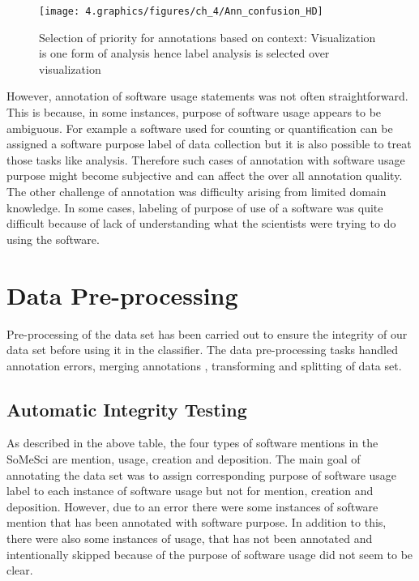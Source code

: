 \begin{figure}[htbp]
	\centering
	\texttt{[image: 4.graphics/figures/ch\_4/Ann\_confusion\_HD]}
	\caption{Selection of priority for annotations based on context: Visualization is one form of analysis hence label analysis is selected over visualization }
	\label{fig:chapter04:setup}
\end{figure}

However, annotation of software usage statements was not often straightforward. This is because, in some instances, purpose of software usage appears to be ambiguous. For example a software used for counting or quantification can be assigned a software purpose label of  data collection but it is also possible to treat those tasks like analysis. Therefore such cases of annotation with software usage purpose might become subjective and can affect the over all annotation quality.\\

The other challenge of annotation was difficulty arising from limited domain knowledge. In some cases, labeling of purpose of use of a software was quite difficult because of lack of understanding what the scientists were trying to do using the software.

\section{Data Pre-processing}
\label{sec:dataset:preprocessing}
Pre-processing of the data set has been carried out to ensure the integrity of our data set before using it in the classifier. The data pre-processing tasks handled annotation errors, merging annotations , transforming and splitting of data set. 

\subsection{Automatic Integrity Testing }
\label{subsec:dataset:preprocessing:handlingerrors}

As described in the above table, the four types of software mentions in the SoMeSci are mention, usage, creation and deposition. The main goal of annotating the data set was to assign corresponding purpose of software usage label to each instance of software usage but not for mention, creation and deposition. However, due to an error there were some instances of software mention that has been annotated with software purpose. In addition to this, there were also some instances of usage, that has not been annotated and intentionally skipped because of the purpose of software usage did not seem to be clear. \\

